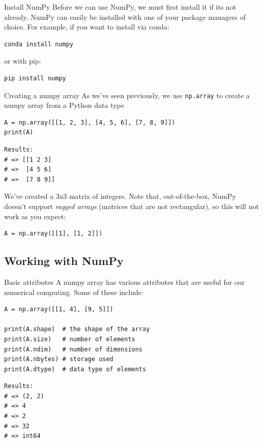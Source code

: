 \documentclass[10pt]{beamer}
\begin{document}
\begin{frame}[label={sec:org0044b6f},fragile]{Install NumPy}
 Before we can use NumPy, we must first install it if its not already. NumPy can
easily be installed with one of your package managers of choice. For example, if you
want to install via conda:

\begin{verbatim}
conda install numpy
\end{verbatim}

or with pip:

\begin{verbatim}
pip install numpy
\end{verbatim}
\end{frame}

\begin{frame}[label={sec:orgaaf6e59},fragile]{Creating a numpy array}
 As we've seen previously, we use \texttt{np.array} to create a numpy array from a Python data type

\begin{verbatim}
A = np.array([[1, 2, 3], [4, 5, 6], [7, 8, 9]])
print(A)
\end{verbatim}

\begin{verbatim}
Results: 
# => [[1 2 3]
# =>  [4 5 6]
# =>  [7 8 9]]
\end{verbatim}


We've created a 3x3 matrix of integers. Note that, out-of-the-box, NumPy doesn't
support \emph{ragged arrays} (matrices that are not rectangular), so this will not work as
you expect:

\begin{verbatim}
A = np.array([[1], [1, 2]])
\end{verbatim}
\end{frame}

\subsection{Working with NumPy}
\label{sec:org5fbce2c}

\begin{frame}[label={sec:org00af38c},fragile]{Basic attributes}
 A numpy array has various attributes that are useful for our numerical
computing. Some of these include:

\begin{verbatim}
A = np.array([[1, 4], [9, 5]])

print(A.shape)  # the shape of the array
print(A.size)   # number of elements
print(A.ndim)   # number of dimensions
print(A.nbytes) # storage used
print(A.dtype)  # data type of elements
\end{verbatim}

\begin{verbatim}
Results: 
# => (2, 2)
# => 4
# => 2
# => 32
# => int64
\end{verbatim}
\end{frame}
\end{document}

